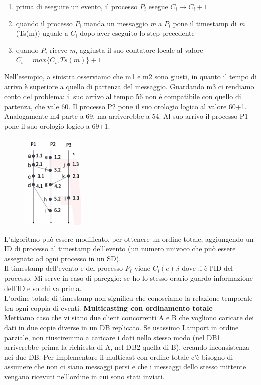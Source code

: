 \documentclass[12pt,italian]{report}
\begin{document}
\begin{enumerate}
    \item prima di eseguire un evento, il processo $P_i$ esegue $C_i \longrightarrow C_i + 1$
    \item quando il processo $P_i$ manda un messaggio \textit{m} a $P_i$ pone il timestamp di \textit{m} (Ts(m)) uguale a $C_i$ dopo aver eseguito lo step precedente
    \item quando $P_i$ riceve \textit{m}, aggiusta il suo contatore locale al valore $C_i = max\{C_i, Ts(m)\} + 1$
\end{enumerate}
Nell'esempio, a sinistra osserviamo che m1 e m2 sono giusti, in quanto il tempo di arrivo è superiore a quello di partenza del messaggio. Guardando m3 ci rendiamo conto del problema: il suo arrivo al tempo 56 non è compatibile con quello di partenza, che vale 60. Il processo P2 pone il suo orologio logico al valore 60+1. Analogamente m4 parte a 69, ma arriverebbe a 54. Al suo arrivo il processo P1 pone il suo orologio logico a 69+1. 
\bigbreak
\begin{figure}[h]
\centering
\includegraphics[width=30mm]{img/lamport2.png}
\end{figure}
\bigbreak
L'algoritmo può essere modificato. per ottenere un ordine totale, aggiungendo un ID di processo al timestamp dell'evento (un numero univoco che può essere assegnato ad ogni processo in un SD). \\ Il timestamp dell'evento e del processo $P_i$ viene $C_{i}(e).i$ dove .i è l'ID del processo. Mi serve in caso di pareggio: se ho lo stesso orario guardo informazione dell'ID e so chi va prima. \\ L'ordine totale di timestamp non significa che conosciamo la relazione temporale tra ogni coppia di eventi.
\bigbreak
\noindent \textbf{Multicasting con ordinamento totale} \\ Mettiamo caso che vi siano due client concorrenti A e B che vogliono caricare dei dati in due copie diverse in un DB replicato. Se usassimo Lamport in ordine parziale, non riusciremmo a caricare i dati nello stesso modo (nel DB1 arriverebbe prima la richiesta di A, nel DB2 quella di B), creando inconsistenza nei due DB. Per implementare il multicast con ordine totale c'è bisogno di assumere che non ci siano messaggi persi e che i messaggi dello stesso mittente vengano ricevuti nell'ordine in cui sono stati inviati.
\end{document}
